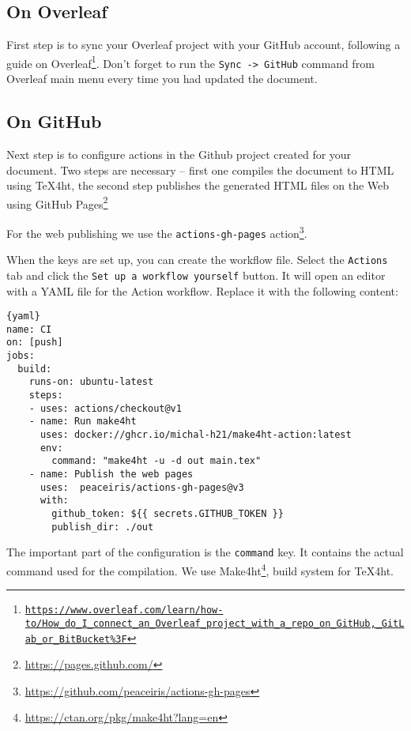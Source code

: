 \documentclass{article}
\newcommand{\cmdname}[1]{\texttt{#1}}
\newcommand\footurl[1]{\footnote{\url{#1}}}
\newcommand\urllink[2]{#1\footurl{#2}}
\newcommand\foothref[3]{#1\footnote{\href{#2}{#3}}}
\begin{document}
\subsection{On Overleaf}

First step is to sync your Overleaf project with your GitHub account, following \foothref{a guide on 
  Overleaf}{https://www.overleaf.com/learn/how-to/How_do_I_connect_an_Overleaf_project_with_a_repo_on_GitHub,_GitLab_or_BitBucket\%3F}
{\texttt{https://www.overleaf.com/learn/how-to/How\_do\_I\_connect\_an\_Overleaf\_project\_with\_a\allowbreak\_repo\_on\_GitHub,\_GitLab\_or\_BitBucket\%3F}}. 
Don't forget to run the \cmdname{Sync -> GitHub} command from Overleaf main menu every time you had updated the document.

\subsection{On GitHub}
Next step is to configure actions in the Github project created for your
document. Two steps are necessary -- first  one compiles the document to HTML
using \TeX4ht, the second step publishes the generated HTML files on the Web
using \urllink{GitHub Pages}{https://pages.github.com/}

For the web publishing we  use the \verb|actions-gh-pages|
\urllink{action}{https://github.com/peaceiris/actions-gh-pages}. 

When the keys are set up, you can create the workflow file. Select the
\cmdname{Actions} tab and click the \cmdname{Set up a workflow yourself}
button. It will open an editor with a YAML file for the Action workflow.
Replace it with the following content:


\begin{lstlisting}{yaml}
name: CI
on: [push]
jobs:
  build:
    runs-on: ubuntu-latest
    steps:
    - uses: actions/checkout@v1
    - name: Run make4ht
      uses: docker://ghcr.io/michal-h21/make4ht-action:latest
      env:
        command: "make4ht -u -d out main.tex"
    - name: Publish the web pages
      uses:  peaceiris/actions-gh-pages@v3
      with:
        github_token: ${{ secrets.GITHUB_TOKEN }}
        publish_dir: ./out
\end{lstlisting}

The important part of the configuration is the \cmdname{command} key. It
contains the actual command used for the compilation. We use
\urllink{Make4ht}{https://ctan.org/pkg/make4ht?lang=en}, build system for
\TeX4ht.
\end{document}
